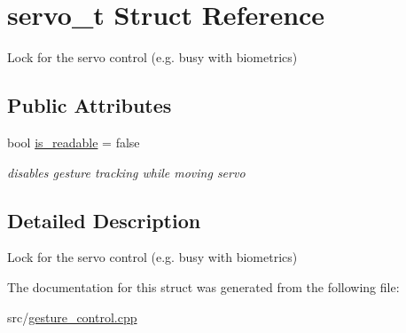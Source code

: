 \hypertarget{structservo__t}{}\section{servo\+\_\+t Struct Reference}
\label{structservo__t}


Lock for the servo control (e.\+g. busy with biometrics)  


\subsection*{Public Attributes}
\begin{DoxyCompactItemize}
\item 
bool \hyperlink{structservo__t_a2d870f86b97b371fff86ac1c02f789f6}{is\+\_\+readable} = false\hypertarget{structservo__t_a2d870f86b97b371fff86ac1c02f789f6}{}\label{structservo__t_a2d870f86b97b371fff86ac1c02f789f6}

\begin{DoxyCompactList}\small\item\em disables gesture tracking while moving servo \end{DoxyCompactList}\end{DoxyCompactItemize}


\subsection{Detailed Description}
Lock for the servo control (e.\+g. busy with biometrics) 

The documentation for this struct was generated from the following file\+:\begin{DoxyCompactItemize}
\item 
src/\hyperlink{gesture__control_8cpp}{gesture\+\_\+control.\+cpp}\end{DoxyCompactItemize}

